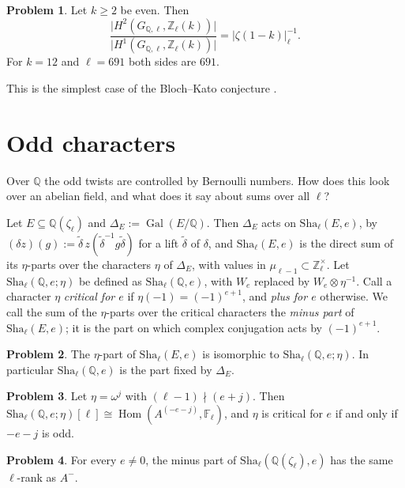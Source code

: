 \documentclass[reqno]{amsart}
\theoremstyle{definition}
\newtheorem{problem}{Problem}[section]
\theoremstyle{plain}
\theoremstyle{remark}
\newcommand{\Z}{\mathbb{Z}}
\newcommand{\Q}{\mathbb{Q}}
\newcommand{\F}{\mathbb{F}}
\newcommand{\Zl}{\Z_\ell}
\newcommand{\Gal}{\operatorname{Gal}}
\newcommand{\Hom}{\operatorname{Hom}}
\newcommand{\Sha}{\mathrm{Sha}}
\begin{document}
\begin{problem}\label{pr:BK}
Let \(k \ge 2\) be even.  Then
\[
  \frac{\lvert H^2(G_{\Q,\ell}, \Zl(k)) \rvert}{\lvert H^1(G_{\Q,\ell}, \Zl(k)) \rvert} = \lvert \zeta(1-k) \rvert_\ell^{-1} .
\]
For \(k = 12\) and \(\ell = 691\) both sides are \(691\).
\end{problem}

This is the simplest case of the Bloch--Kato conjecture \cite{BK}.

\section{Odd characters}\label{sec:split}

Over \(\Q\) the odd twists are controlled by Bernoulli numbers.  How does this look over an abelian field, and what does it say about sums over all \(\ell\)?

Let \(E \subseteq \Q(\zeta_\ell)\) and \(\Delta_E := \Gal(E/\Q)\).  Then \(\Delta_E\) acts on \(\Sha_\ell(E, e)\), by \((\delta z)(g) := \tilde\delta\, z(\tilde\delta^{-1} g \tilde\delta)\) for a lift \(\tilde\delta\) of \(\delta\), and \(\Sha_\ell(E, e)\) is the direct sum of its \(\eta\)-parts over the characters \(\eta\) of \(\Delta_E\), with values in \(\mu_{\ell-1} \subset \Zl^\times\).  Let \(\Sha_\ell(\Q, e; \eta)\) be defined as \(\Sha_\ell(\Q, e)\), with \(W_e\) replaced by \(W_e \otimes \eta^{-1}\).  Call a character \(\eta\) \emph{critical for \(e\)} if \(\eta(-1) = (-1)^{e+1}\), and \emph{plus for \(e\)} otherwise.  We call the sum of the \(\eta\)-parts over the critical characters the \emph{minus part} of \(\Sha_\ell(E, e)\); it is the part on which complex conjugation acts by \((-1)^{e+1}\).

\begin{problem}\label{pr:induced}
The \(\eta\)-part of \(\Sha_\ell(E, e)\) is isomorphic to \(\Sha_\ell(\Q, e; \eta)\).  In particular \(\Sha_\ell(\Q, e)\) is the part fixed by \(\Delta_E\).
\end{problem}

\begin{problem}\label{pr:eta-rank}
Let \(\eta = \omega^j\) with \((\ell - 1) \nmid (e + j)\).  Then \(\Sha_\ell(\Q, e; \eta)[\ell] \cong \Hom(A^{(-e-j)}, \F_\ell)\), and \(\eta\) is critical for \(e\) if and only if \(-e-j\) is odd.
\end{problem}

\begin{problem}\label{pr:parity}
For every \(e \ne 0\), the minus part of \(\Sha_\ell(\Q(\zeta_\ell), e)\) has the same \(\ell\)-rank as \(A^-\).
\end{problem}
\end{document}

